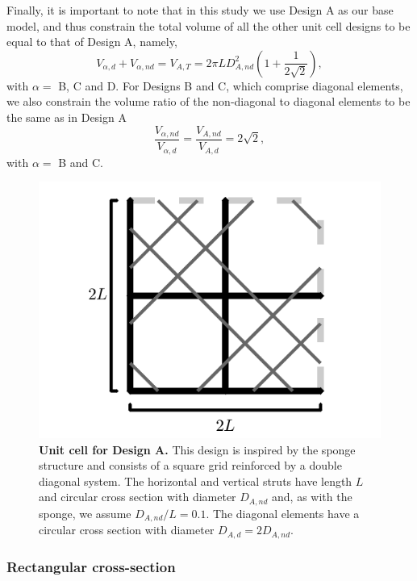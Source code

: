 \documentclass[10pt,twoside]{fernandes_supp}
\begin{document}
Finally, it is important to note that in this study we use Design A as our base model, and thus constrain the total volume of all the other unit cell designs to be equal to that of Design A, namely,
\begin{equation}\label{con1}
V_{\alpha,d}+V_{\alpha,nd}={V}_{A,T}=2\pi L D_{A,nd}^2 \left(1+\frac{1}{2\sqrt{2}}\right),
\end{equation}
with $\alpha=$ B, C and D.
For Designs B and C, which comprise diagonal elements, we also  constrain the volume ratio of the non-diagonal to diagonal elements to be the same as in Design A
\begin{equation}\label{con2}
\frac{V_{\alpha,nd}}{V_{\alpha,d}}=\frac{V_{A,nd}}{V_{A,d}}=2\sqrt{2},
\end{equation}
with $\alpha=$ B and C.

\begin{figure}[H]
    \centering
    \includegraphics[width=0.4\linewidth]{SFig2.png}
    \caption{{\bf Unit cell for Design A.} This design is inspired by the sponge structure and consists of a square grid  reinforced by a double diagonal system. The horizontal and vertical struts have length $L$ and circular cross section with diameter $D_{A,nd}$ and, as with the sponge, we assume $D_{A,nd}/L=0.1$. The diagonal elements have a circular cross section  with diameter $D_{A,d}=2 D_{A,nd}$.}
    \label{DesignA}
\end{figure}

\subsubsection{Rectangular cross-section}
\end{document}
